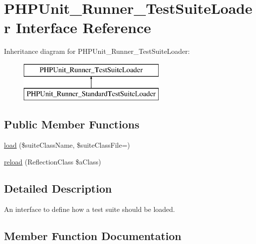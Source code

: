 \hypertarget{interface_p_h_p_unit___runner___test_suite_loader}{}\section{P\+H\+P\+Unit\+\_\+\+Runner\+\_\+\+Test\+Suite\+Loader Interface Reference}
\label{interface_p_h_p_unit___runner___test_suite_loader}
Inheritance diagram for P\+H\+P\+Unit\+\_\+\+Runner\+\_\+\+Test\+Suite\+Loader\+:\begin{figure}[H]
\begin{center}
\leavevmode
\includegraphics[height=2.000000cm]{interface_p_h_p_unit___runner___test_suite_loader}
\end{center}
\end{figure}
\subsection*{Public Member Functions}
\begin{DoxyCompactItemize}
\item 
\mbox{\hyperlink{interface_p_h_p_unit___runner___test_suite_loader_a7d5039d0eb5672c1b69bbbb8c922c02b}{load}} (\$suite\+Class\+Name, \$suite\+Class\+File=\textquotesingle{}\textquotesingle{})
\item 
\mbox{\hyperlink{interface_p_h_p_unit___runner___test_suite_loader_af50f6853c6ef14bbd0162b490c45eb66}{reload}} (Reflection\+Class \$a\+Class)
\end{DoxyCompactItemize}


\subsection{Detailed Description}
An interface to define how a test suite should be loaded. 

\subsection{Member Function Documentation}
\mbox{\label{interface_p_h_p_unit___runner___test_suite_loader_a7d5039d0eb5672c1b69bbbb8c922c02b}} 
